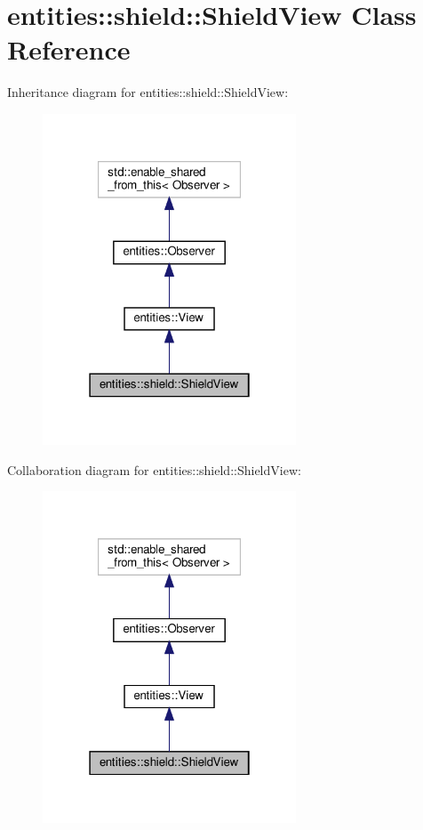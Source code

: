 \hypertarget{classentities_1_1shield_1_1ShieldView}{}\section{entities\+:\+:shield\+:\+:Shield\+View Class Reference}
\label{classentities_1_1shield_1_1ShieldView}


Inheritance diagram for entities\+:\+:shield\+:\+:Shield\+View\+:\nopagebreak
\begin{figure}[H]
\begin{center}
\leavevmode
\includegraphics[width=214pt]{classentities_1_1shield_1_1ShieldView__inherit__graph}
\end{center}
\end{figure}


Collaboration diagram for entities\+:\+:shield\+:\+:Shield\+View\+:\nopagebreak
\begin{figure}[H]
\begin{center}
\leavevmode
\includegraphics[width=214pt]{classentities_1_1shield_1_1ShieldView__coll__graph}
\end{center}
\end{figure}
